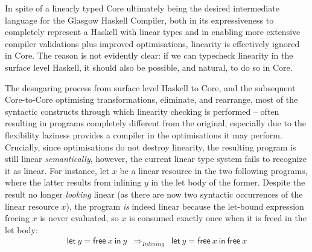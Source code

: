 \documentclass[acmsmall, screen, review]{acmart}
\newcommand{\llet}[2]{\mathsf{let}~#1~\mathsf{in}~#2}
\begin{document}
%

In spite of a linearly typed Core ultimately being the desired intermediate
language for the Glasgow Haskell Compiler,
both in its expressiveness to completely represent a Haskell with
linear types and in enabling more extensive compiler validations plus improved optimisations,
linearity is effectively ignored in Core. The reason is not evidently clear:
if we can typecheck linearity in the surface level Haskell, it should also be
possible, and natural, to do so in Core.

The desugaring process from surface level Haskell to Core, and the subsequent
Core-to-Core optimising transformations, eliminate, and rearrange, most of the
syntactic constructs through which linearity checking is performed -- often
resulting in programs completely different from the original, especially due to
the flexibility laziness provides a compiler in the optimisations it may
perform. %
%
Crucially, since optimisations do not destroy linearity, the resulting program
is still linear \emph{semantically}, however, the current linear type system
fails to recognize it as linear.
%
%
For instance, let $x$ be a linear resource in the two following programs, where
the latter results from inlining $y$ in the let body of the former. Despite the
result no longer \emph{looking} linear (as there are now two syntactic
occurrences of the linear resource $x$), the program \emph{is} indeed linear
because the let-bound expression freeing $x$ is never evaluated, so $x$ is
consumed exactly once when it is freed in the let body:
%
\[
\begin{array}{ccc}
\llet{y = \textsf{free}~x}{y} & \Longrightarrow_{Inlining} & \llet{y = \textsf{free}~x}{\textsf{free}~x}
\end{array}
\]
\end{document}
